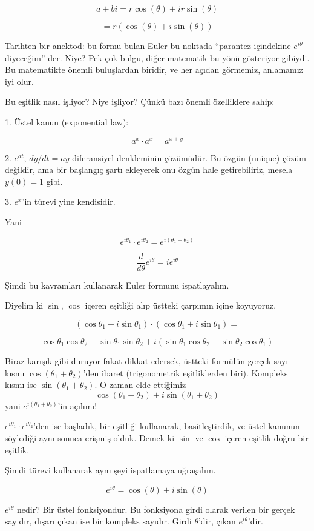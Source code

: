 \documentclass[12pt,fleqn]{article}\usepackage{../../common}
\begin{document}
$$ a+bi = r\cos(\theta) + ir\sin(\theta) $$

$$ = r (\cos(\theta) + i\sin(\theta)) $$

Tarihten bir anektod: bu formu bulan Euler bu noktada ``parantez içindekine
$e^{i\theta}$ diyeceğim'' der. Niye? Pek çok bulgu, diğer matematik bu yönü
gösteriyor gibiydi. Bu matematikte önemli buluşlardan biridir, ve her
açıdan görmemiz, anlamamız iyi olur. 

Bu eşitlik nasıl işliyor? Niye işliyor? Çünkü bazı önemli özelliklere sahip:

1. Üstel kanun (exponential law):

$$ a^x \cdot a^x = a^{x+y} $$

2. $e^{at}$, $dy/dt = ay$ diferansiyel denkleminin çözümüdür. Bu özgün
(unique) çözüm değildir, ama bir başlangıç şartı ekleyerek onu özgün hale
getirebiliriz, mesela $y(0)=1$ gibi.

3. $e^x$'in türevi yine kendisidir. 

Yani

$$ e^{i\theta_1} \cdot  e^{i\theta_2} = e^{i(\theta_1 + \theta_2)}$$

$$ \frac{d}{d\theta} e^{i\theta} = i e^{i\theta} $$

Şimdi bu kavramları kullanarak Euler formunu ispatlayalım. 

Diyelim ki $\sin$, $\cos$ içeren eşitliği alıp üstteki çarpımın içine
koyuyoruz.

$$ 
(\cos\theta_1 + i\sin\theta_1) \cdot (\cos\theta_1 + i\sin\theta_1) =
$$ 

$$  
\cos\theta_1\cos\theta_2 - \sin\theta_1\sin\theta_2 +
i(\sin\theta_1\cos\theta_2 + \sin\theta_2\cos\theta_1 )
$$ 

Biraz karışık gibi duruyor fakat dikkat edersek, üstteki formülün gerçek
sayı kısmı $\cos(\theta_1 + \theta_2)$'den ibaret (trigonometrik eşitliklerden biri). 
Kompleks kısmı ise $\sin(\theta_1 + \theta_2)$. O zaman elde ettiğimiz $$
\cos(\theta_1+\theta_2) + i\sin(\theta_1+\theta_2) $$ 
yani $e^{i(\theta_1+\theta_2)}$'in açılımı!

$e^{i\theta_1} \cdot e^{i\theta_2}$'den ise başladık, bir eşitliği kullanarak, basitleştirdik, 
ve üstel kanunun söylediği aynı sonuca erişmiş olduk. Demek ki $\sin$ ve $\cos$ 
içeren eşitlik doğru bir eşitlik.

Şimdi türevi kullanarak aynı şeyi ispatlamaya uğraşalım. 

$$ e^{i\theta} = \cos(\theta) + i\sin(\theta) $$

$e^{i\theta}$ nedir? Bir üstel fonksiyondur. Bu fonksiyona girdi olarak
verilen bir gerçek sayıdır, dışarı çıkan ise bir kompleks sayıdır. Girdi
$\theta$'dir, çıkan $e^{i\theta}$'dir.
\end{document}
